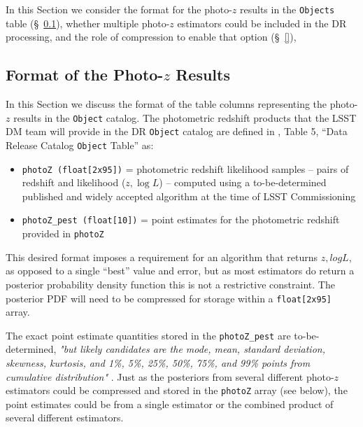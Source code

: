 \documentclass[DM,lsstdraft,toc]{lsstdoc}
\begin{document}
In this Section we consider the format for the photo-$z$ results in the {\tt Objects} table (\S~\ref{ssec:tech_format}), whether multiple photo-$z$ estimators could be included in the DR processing, and the role of compression to enable that option (\S~\ref{}), 

\subsection{Format of the Photo-$z$ Results}\label{ssec:tech_format}

In this Section we discuss the format of the table columns representing the photo-$z$ results in the {\tt Object} catalog. The photometric redshift products that the LSST DM team will provide in the DR {\tt Object} catalog are defined in \DPDD, Table 5, ``Data Release Catalog {\tt Object} Table'' as:
\begin{itemize}
\item \texttt{photoZ (float[2x95])} = photometric redshift likelihood samples -- pairs of redshift and likelihood ($z,\log{L}$) -- computed using a to-be-determined published and widely accepted algorithm at the time of LSST Commissioning
\item \texttt{photoZ\_pest (float[10])} = point estimates for the photometric redshift provided in {\tt photoZ}
\end{itemize}

\noindent This desired format imposes a requirement for an algorithm that returns $z,logL$, as opposed to a single ``best'' value and error, but as most estimators do return a posterior probability density function this is not a restrictive constraint. The posterior PDF will need to be compressed for storage within a \texttt{float[2x95]} array. 

The exact point estimate quantities stored in the \texttt{photoZ\_pest} are to-be-determined, {\it "but likely candidates are the mode, mean, standard deviation, skewness, kurtosis, and 1\%, 5\%, 25\%, 50\%, 75\%, and 99\% points from cumulative distribution"} . Just as the posteriors from several different photo-$z$ estimators could be compressed and stored in the \texttt{photoZ} array (see below), the point estimates could be from a single estimator or the combined product of several different estimators. 
\end{document}
